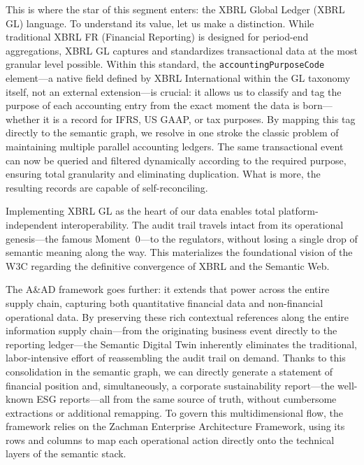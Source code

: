 \documentclass[12pt, a4paper]{article}
\begin{document}
This is where the star of this segment enters: the XBRL Global Ledger (XBRL GL) language. To understand its value, let us make a distinction. While traditional XBRL FR (Financial Reporting) is designed for period-end aggregations, XBRL GL captures and standardizes transactional data at the most granular level possible. Within this standard, the \texttt{accountingPurposeCode} element---a native field defined by XBRL International within the GL taxonomy itself, not an external extension---is crucial: it allows us to classify and tag the purpose of each accounting entry from the exact moment the data is born---whether it is a record for IFRS, US GAAP, or tax purposes. By mapping this tag directly to the semantic graph, we resolve in one stroke the classic problem of maintaining multiple parallel accounting ledgers. The same transactional event can now be queried and filtered dynamically according to the required purpose, ensuring total granularity and eliminating duplication. What is more, the resulting records are capable of self-reconciling.

Implementing XBRL GL as the heart of our data enables total platform-independent interoperability. The audit trail travels intact from its operational genesis---the famous Moment~0---to the regulators, without losing a single drop of semantic meaning along the way. This materializes the foundational vision of the W3C \cite{w3cxbrl} regarding the definitive convergence of XBRL and the Semantic Web.

The A\&AD framework goes further: it extends that power across the entire supply chain, capturing both quantitative financial data and non-financial operational data. By preserving these rich contextual references along the entire information supply chain---from the originating business event directly to the reporting ledger---the Semantic Digital Twin inherently eliminates the traditional, labor-intensive effort of reassembling the audit trail on demand. Thanks to this consolidation in the semantic graph, we can directly generate a statement of financial position and, simultaneously, a corporate sustainability report---the well-known ESG reports---all from the same source of truth, without cumbersome extractions or additional remapping. To govern this multidimensional flow, the framework relies on the Zachman Enterprise Architecture Framework, using its rows and columns to map each operational action directly onto the technical layers of the semantic stack.
\end{document}
